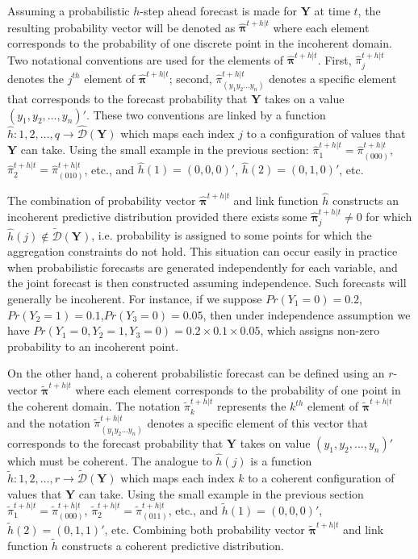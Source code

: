 \documentclass[a4paper,review,12pt,authoryear]{elsarticle}
\newcommand{\bY}{\mathbf{Y}}
\newcommand{\bpi}{\bm{\pi}}
\begin{document}
  \label{sec:coherent_df}

  Assuming a probabilistic $h$-step ahead forecast is made for $\bY$ at time $t$, the resulting probability vector will be denoted as $\hat{\bpi}^{t+h|t}$ where each element corresponds to the probability of one discrete point in the incoherent domain. 
  Two notational conventions are used for the elements of $\hat{\bpi}^{t+h|t}$.
  First, $\hat{\pi}_j^{t+h|t}$ denotes the $j^{th}$ element of $\hat{\bpi}^{t+h|t}$;  
  second, $\hat{\pi}_{(y_1 y_2 \dots y_n)}^{t+h|t}$ denotes a specific element that corresponds to the forecast probability that $\bY$ takes on a value $(y_1,y_2,\dots,y_n)'$. These two conventions are linked by a function $\hat{h}:{1,2,\dots,q}\rightarrow\hat{\mathcal{D}}(\bY)$ which maps each index $j$ to a configuration of values that $\bY$ can take. 
  Using the small example in the previous section: $\hat{\pi}_1^{t+h|t}=\hat{\pi}_{(000)}^{t+h|t}$, $\hat{\pi}_2^{t+h|t}=\hat{\pi}_{(010)}^{t+h|t}$, etc., and $\hat{h}(1)=(0,0,0)'$, $\hat{h}(2)=(0,1,0)'$, etc.
  
  The combination of probability vector $\hat{\bpi}^{t+h|t}$ and link function $\hat h$ constructs an incoherent predictive distribution provided there exists some $\hat{\bpi}^{t+h|t}_j\neq 0$ for which $\hat{h}(j)\notin\tilde{\mathcal{D}}(\bY)$, i.e. probability is assigned to some points for which the aggregation constraints do not hold. 
  This situation can occur easily in practice when probabilistic forecasts are generated independently for each variable, and the joint forecast is then constructed assuming independence. 
  Such forecasts will generally be incoherent. 
  For instance, if we suppose $Pr(Y_1=0)=0.2$,$Pr(Y_2=1)=0.1$,$Pr(Y_3=0)=0.05$, then under independence assumption we have $Pr(Y_1=0,Y_2=1,Y_3=0)=0.2\times0.1\times0.05$, which assigns non-zero probability to an incoherent point.
  
  On the other hand, a coherent probabilistic forecast can be defined using an $r$-vector $\tilde{\bpi}^{t+h|t}$ where each element corresponds to the probability of one point in the coherent domain. 
  The notation $\tilde{\pi}_k^{t+h|t}$ represents the $k^{th}$ element of $\tilde{\bpi}^{t+h|t}$ and the notation $\tilde{\pi}_{(y_1 y_2 \dots y_n)}^{t+h|t}$ denotes a specific element of this vector that corresponds to the forecast probability that $\bY$ takes on value $(y_1,y_2,\dots,y_n)'$ which must be coherent. 
  The analogue to $\hat{h}(j)$ is a function  $\tilde{h}:{1,2,\dots,r}\rightarrow\tilde{\mathcal{D}}(\bY)$ which maps each index $k$ to a coherent configuration of values that $\bY$ can take. 
  Using the small example in the previous section $\tilde{\pi}_1^{t+h|t}=\tilde{\pi}_{(000)}^{t+h|t}$, $\tilde{\pi}_2^{t+h|t}=\tilde{\pi}_{(011)}^{t+h|t}$, etc., and $\tilde{h}(1)=(0,0,0)'$, $\tilde{h}(2)=(0,1,1)'$, etc.
  Combining both probability vector $\tilde{\bpi}^{t+h|t}$ and link function $\tilde{h}$ constructs a coherent predictive distribution.
  
\end{document}
